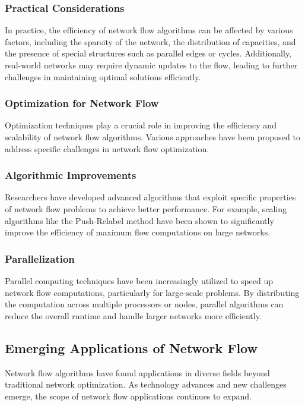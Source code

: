 \documentclass[12pt]{book} %
\begin{document}
\subsubsection{Practical Considerations}
In practice, the efficiency of network flow algorithms can be affected by various factors, including the sparsity of the network, the distribution of capacities, and the presence of special structures such as parallel edges or cycles. Additionally, real-world networks may require dynamic updates to the flow, leading to further challenges in maintaining optimal solutions efficiently.

\subsubsection{Optimization for Network Flow}
Optimization techniques play a crucial role in improving the efficiency and scalability of network flow algorithms. Various approaches have been proposed to address specific challenges in network flow optimization.

\subsubsection{Algorithmic Improvements}
Researchers have developed advanced algorithms that exploit specific properties of network flow problems to achieve better performance. For example, scaling algorithms like the Push-Relabel method have been shown to significantly improve the efficiency of maximum flow computations on large networks.

\subsubsection{Parallelization}
Parallel computing techniques have been increasingly utilized to speed up network flow computations, particularly for large-scale problems. By distributing the computation across multiple processors or nodes, parallel algorithms can reduce the overall runtime and handle larger networks more efficiently.

\subsection{Emerging Applications of Network Flow}
Network flow algorithms have found applications in diverse fields beyond traditional network optimization. As technology advances and new challenges emerge, the scope of network flow applications continues to expand.
\end{document}
